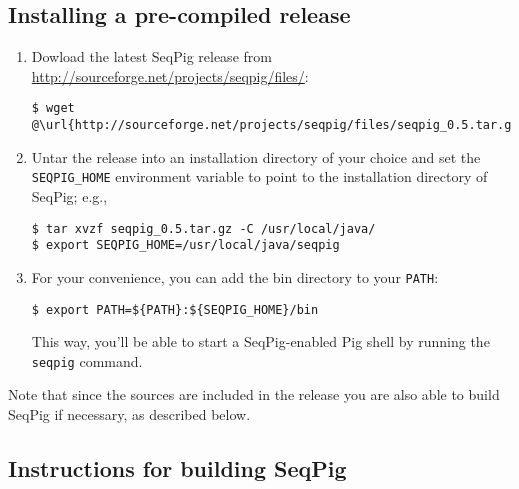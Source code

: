 \subsection{Installing a pre-compiled release}

\begin{enumerate}
\item Dowload the latest SeqPig release from \url{http://sourceforge.net/projects/seqpig/files/}:
\begin{lstlisting} 
$ wget @\url{http://sourceforge.net/projects/seqpig/files/seqpig_0.5.tar.gz}@
\end{lstlisting}
\item Untar the release into an installation directory of your choice and set the {\tt SEQPIG\_HOME}
  environment variable to point to the installation directory of SeqPig; e.g.,
%
\begin{lstlisting} 
$ tar xvzf seqpig_0.5.tar.gz -C /usr/local/java/
$ export SEQPIG_HOME=/usr/local/java/seqpig 
\end{lstlisting}
%
\item For your convenience, you can add the bin directory to your {\tt PATH}:
%
\begin{lstlisting} 
$ export PATH=${PATH}:${SEQPIG_HOME}/bin
\end{lstlisting}
%
This way, you'll be able to start a SeqPig-enabled Pig shell by
running the {\tt seqpig} command.
\end{enumerate}

Note that since the sources are included in the release you are also
able to build SeqPig if necessary, as described below.

\subsection{Instructions for building SeqPig}

